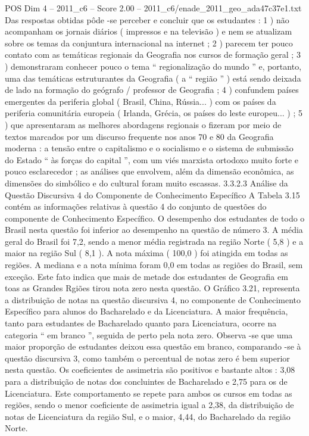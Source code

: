 \begin{textsample}{POS Dim 4 – 2011\_c6 – Score 2.00 – 2011\_c6/enade\_2011\_geo\_ada47c37e1.txt}
Das respostas obtidas pôde -se perceber e concluir que os estudantes : 1 ) não acompanham os jornais diários ( impressos e na televisão ) e nem se atualizam sobre os temas da conjuntura internacional na internet ; 2 ) parecem ter pouco contato com as temáticas regionais da Geografia nos cursos de formação geral ; 3 ) demonstraram conhecer pouco o tema “ regionalização do mundo ” e, portanto, uma das temáticas estruturantes da Geografia ( a “ região ” ) está sendo deixada de lado na formação do geógrafo / professor de Geografia ; 4 ) confundem países emergentes da periferia global ( Brasil, China, Rússia... ) com os países da periferia comunitária europeia ( Irlanda, Grécia, os países do leste europeu... ) ; 5 ) que apresentaram as melhores abordagens regionais o fizeram por meio de textos marcados por um discurso frequente nos anos 70 e 80 da Geografia moderna : a tensão entre o capitalismo e o socialismo e o sistema de submissão do Estado “ às forças do capital ”, com um viés marxista ortodoxo muito forte e pouco esclarecedor ; as análises que envolvem, além da dimensão econômica, as dimensões do simbólico e do cultural foram muito escassas. 3.3.2.3 Análise da Questão Discursiva 4 do Componente de Conhecimento Específico A Tabela 3.15 contém as informações relativas à questão 4 do conjunto de questões do componente de Conhecimento Específico.
O desempenho dos estudantes de todo o Brasil nesta questão foi inferior ao desempenho na questão de número 3.
A média geral do Brasil foi 7,2, sendo a menor média registrada na região Norte ( 5,8 ) e a maior na região Sul ( 8,1 ).
A nota máxima ( 100,0 ) foi atingida em todas as regiões.
A mediana e a nota mínima foram 0,0 em todas as regiões do Brasil, sem exceção.
Este fato indica que mais de metade dos estudantes de Geografia em toas as Grandes Rgiões tirou nota zero nesta questão.
O Gráfico 3.21, representa a distribuição de notas na questão discursiva 4, no componente de Conhecimento Específico para alunos do Bacharelado e da Licenciatura.
A maior frequência, tanto para estudantes de Bacharelado quanto para Licenciatura, ocorre na categoria “ em branco ”, seguida de perto pela nota zero.
Observa -se que uma maior proporção de estudantes deixou essa questão em branco, comparando -se à questão discursiva 3, como também o percentual de notas zero é bem superior nesta questão.
Os coeficientes de assimetria são positivos e bastante altos : 3,08 para a distribuição de notas dos concluintes de Bacharelado e 2,75 para os de Licenciatura.
Este comportamento se repete para ambos os cursos em todas as regiões, sendo o menor coeficiente de assimetria igual a 2,38, da distribuição de notas de Licenciatura da região Sul, e o maior, 4,44, do Bacharelado da região Norte.

\end{textsample}
